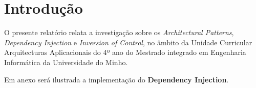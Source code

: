 \section{Introdução}
\label{sec:introducao}

\hspace{3mm} O presente relatório relata a investigação sobre os \textit{Architectural Patterns}, \textit{Dependency Injection} e \textit{Inversion of Control}, no âmbito da Unidade Curricular Arquitecturas Aplicacionais do 4º ano do Mestrado integrado em Engenharia Informática da Universidade do Minho.

Em anexo será ilustrada a implementação do \textbf{Dependency Injection}.